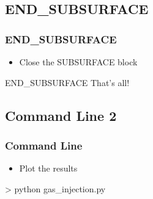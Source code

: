 \documentclass{beamer}
\newcommand\bluecomment[1]{{{\color{blue} #1}}}
\begin{document}
\subsection{END\_SUBSURFACE}
\begin{frame}[fragile]\frametitle{END\_SUBSURFACE}
\begin{itemize}
  \item Close the SUBSURFACE block
\end{itemize}

\begin{semiverbatim}
END_SUBSURFACE \bluecomment{That's all!}
\end{semiverbatim}
\end{frame}

\subsection{Command Line 2}
\begin{frame}[fragile]\frametitle{Command Line}

\begin{itemize}
  \item Plot the results
\end{itemize}

\begin{semiverbatim}
> python gas_injection.py
\end{semiverbatim}

\end{frame}

\end{document}
